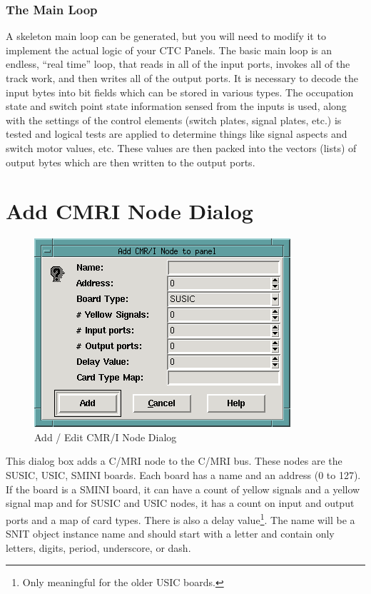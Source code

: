 \subsubsection{The Main Loop}

A skeleton main loop can be generated, but you will need to modify it to
implement the actual logic of your CTC Panels.  The basic main loop is an
endless, ``real time'' loop, that reads in all of the input ports,
invokes all of the track work, and then writes all of the output ports. 
It is necessary to decode the input bytes into bit fields which can be
stored in various types.  The occupation state and switch point state
information sensed from the inputs is used, along with the settings of
the control elements (switch plates, signal plates, etc.) is tested and
logical tests are applied to determine things like signal aspects and
switch motor values, etc. These values are then packed into the vectors
(lists) of output bytes which are then written to the output ports.

\section{Add CMRI Node Dialog}

\begin{figure}[hbpt]
\begin{centering}
\includegraphics{DISPAddEditCMR_INode.png}
\caption{Add / Edit CMR/I Node Dialog}
\label{fig:dispatcher:addeditcmrinodedialog}
\end{centering}
\end{figure}
%
This dialog box adds a C/MRI node to the C/MRI bus.  These nodes are the
SUSIC, USIC, SMINI boards.  Each board has a name and an address (0 to
127). If the board is a SMINI board, it can have a count of yellow
signals and a yellow signal map and for SUSIC and USIC nodes, it has a
count on input and output ports and a map of card types. There is also a
delay value\footnote{Only meaningful for the older USIC boards.}. The
name will be a SNIT object instance name and should start with a letter
and contain only letters, digits, period, underscore, or dash.

